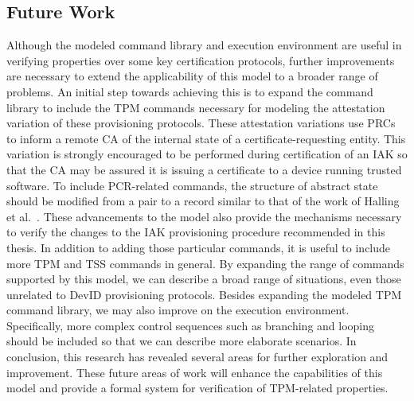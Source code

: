 \documentclass[runningheads]{llncs}
\begin{document}
\subsection{Future Work}
Although the modeled command library and execution environment are useful in verifying properties over some key certification protocols, further improvements are necessary to extend the applicability of this model to a broader range of problems. An initial step towards achieving this is to expand the command library to include the TPM commands necessary for modeling the attestation variation of these provisioning protocols. These attestation variations use PRCs to inform a remote CA of the internal state of a certificate-requesting entity. This variation is strongly encouraged to be performed during certification of an IAK so that the CA may be assured it is issuing a certificate to a device running trusted software. To include PCR-related commands, the structure of abstract state should be modified from a pair to a record similar to that of the work of Halling et al.\ \citep{PrivacyCAAnalysis-Hall}. These advancements to the model also provide the mechanisms necessary to verify the changes to the IAK provisioning procedure recommended in this thesis. In addition to adding those particular commands, it is useful to include more TPM and TSS commands in general. By expanding the range of commands supported by this model, we can describe a broad range of situations, even those unrelated to DevID provisioning protocols.  Besides expanding the modeled TPM command library, we may also improve on the execution environment. Specifically, more complex control sequences such as branching and looping should be included so that we can describe more elaborate scenarios.  In conclusion, this research has revealed several areas for further exploration and improvement. These future areas of work will enhance the capabilities of this model and provide a formal system for verification of TPM-related properties.
%
%
%
\end{document}
